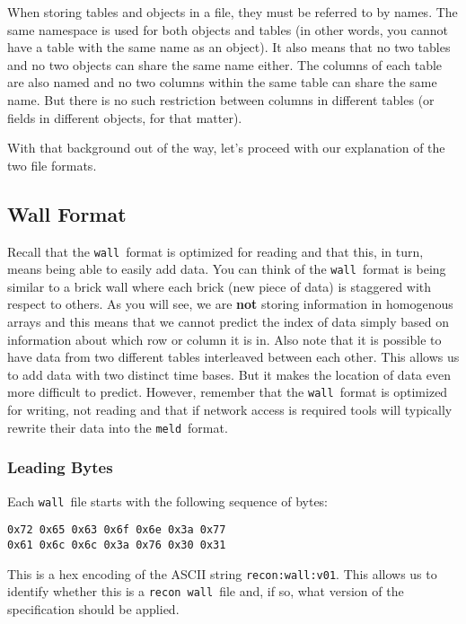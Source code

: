 \documentclass[11pt,a4paper,twocolumn]{article}
\newcommand{\recon}{\texttt{recon}}
\newcommand{\wall}{\texttt{wall}}
\newcommand{\meld}{\texttt{meld}}
\newcommand{\code}[1]{\texttt{#1}} %
\begin{document}
When storing tables and objects in a file, they must be referred to by
names.  The same namespace is used for both objects and tables (in
other words, you cannot have a table with the same name as an
object).  It also means that no two tables and no two objects can
share the same name either.  The columns of each table are also named
and no two columns within the same table can share the same name.  But
there is no such restriction between columns in different tables (or
fields in different objects, for that matter).

With that background out of the way, let's proceed with our
explanation of the two file formats.

\subsection{Wall Format}
\label{sec:wall_spec}

Recall that the \wall\ format is optimized for reading and that this,
in turn, means being able to easily add data.  You can think of the
\wall\ format is being similar to a brick wall where each brick (new
piece of data) is staggered with respect to others.  As you will see,
we are \textbf{not} storing information in homogenous arrays and this
means that we cannot predict the index of data simply based on
information about which row or column it is in.  Also note that it is
possible to have data from two different tables interleaved between
each other.  This allows us to add data with two distinct time bases.
But it makes the location of data even more difficult to predict.
However, remember that the \wall\ format is optimized for writing, not
reading and that if network access is required tools will typically
rewrite their data into the \meld\ format.

\subsubsection{Leading Bytes}

Each \wall\ file starts with the following sequence of bytes:

\begin{verbatim}
0x72 0x65 0x63 0x6f 0x6e 0x3a 0x77
0x61 0x6c 0x6c 0x3a 0x76 0x30 0x31
\end{verbatim}

This is a hex encoding of the ASCII string \code{recon:wall:v01}.
This allows us to identify whether this is a \recon\ \wall\ file and, if
so, what version of the specification should be applied.
\end{document}
